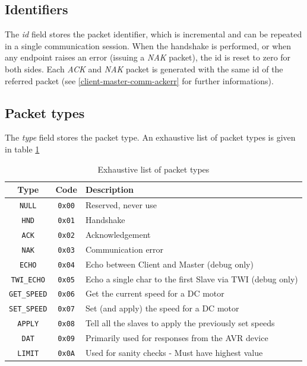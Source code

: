 \documentclass[binding=0.6cm,Lau]{sapthesis}
\begin{document}
\subsection{Identifiers}
The \emph{id} field stores the packet identifier, which is incremental and can
be repeated in a single communication session. When the handshake is performed,
or when any endpoint raises an error (issuing a \emph{NAK} packet), the id is
reset to zero for both sides. Each \emph{ACK} and \emph{NAK} packet is
generated with the same id of the referred packet (see
\ref{client-master-comm-ackerr} for further informations).

\subsection{Packet types}
The \emph{type} field stores the packet type. An exhaustive list of packet
types is given in table \ref{tab:packet-types}

\begin{table}[bh]
  \begin{tabularx}{\textwidth}{c c X}
    \toprule
    Type & Code & Description \\
    \midrule
    \texttt{NULL}       & \texttt{0x00} & Reserved, never use \\
    \texttt{HND}        & \texttt{0x01} & Handshake \\
    \texttt{ACK}        & \texttt{0x02} & Acknowledgement \\
    \texttt{NAK}        & \texttt{0x03} & Communication error \\
    \texttt{ECHO}       & \texttt{0x04} & Echo between Client and Master (debug only)\\
    \texttt{TWI\_ECHO}  & \texttt{0x05} & Echo a single char to the first Slave via TWI (debug only)\\
    \texttt{GET\_SPEED} & \texttt{0x06} & Get the current speed for a DC motor \\
    \texttt{SET\_SPEED} & \texttt{0x07} & Set (and apply) the speed for a DC motor \\
    \texttt{APPLY}      & \texttt{0x08} & Tell all the slaves to apply the previously set speeds \\
    \texttt{DAT}        & \texttt{0x09} & Primarily used for responses from the AVR device \\
    \texttt{LIMIT}      & \texttt{0x0A} & Used for sanity checks - Must have highest value \\
    \bottomrule
  \end{tabularx}
  \caption{Exhaustive list of packet types}
  \label{tab:packet-types}
\end{table}
\end{document}
